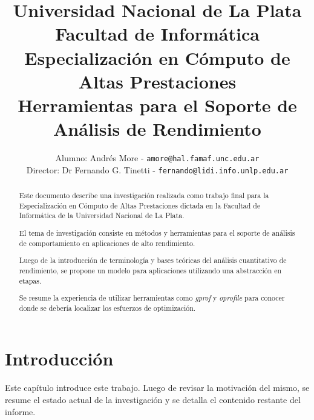 \documentclass[a4paper]{report}
\begin{document}
\title{
  Universidad Nacional de La Plata\\Facultad de Inform\'atica\\
  \bigskip
  Especializaci\'on en C\'omputo de Altas Prestaciones\\
  \bigskip
  Herramientas para el Soporte de An\'alisis de Rendimiento
}

\author{
  Alumno: Andr\'es More - {\tt amore@hal.famaf.unc.edu.ar}\\
  Director: Dr Fernando G. Tinetti - {\tt fernando@lidi.info.unlp.edu.ar}
}


\maketitle

\begin{abstract}

  \bigskip

  Este documento describe una investigaci\'on realizada como trabajo final para
  la Especializaci\'on en C\'omputo de Altas Prestaciones dictada en la Facultad
  de Inform\'atica de la Universidad Nacional de La Plata.

  \bigskip

  El tema de investigaci\'on consiste en m\'etodos y herramientas para el soporte
  de an\'alisis de comportamiento en aplicaciones de alto rendimiento.

  \bigskip

  Luego de la introducci\'on de terminolog\'ia y bases te\'oricas del an\'alisis cuantitativo
  de rendimiento, se propone un modelo para aplicaciones utilizando una abstracci\'on en etapas.

  \bigskip

  Se resume la experiencia de utilizar herramientas como {\it gprof} y {\it oprofile}
  para conocer donde se deber\'ia localizar los esfuerzos de optimizaci\'on.

\end{abstract}

\tableofcontents

\chapter{Introducci\'on}

Este cap\'itulo introduce este trabajo. Luego de revisar la motivaci\'on del mismo,
se resume el estado actual de la investigaci\'on y se detalla el contenido restante
del informe.
\end{document}
